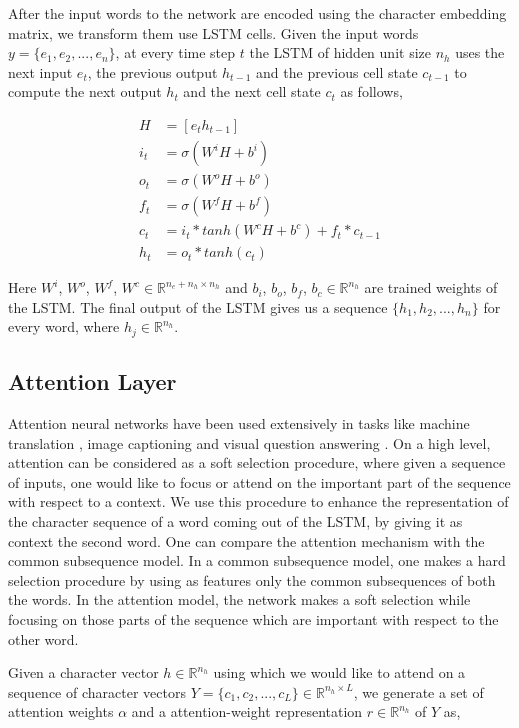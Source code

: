 \documentclass[11pt,letterpaper]{article}
\begin{document}
After the input words to the network are encoded using the character embedding matrix, we transform them use LSTM cells. Given the input words $y = \{e_1, e_2, ..., e_n\}$, at every time step $t$ the LSTM of hidden unit size $n_h$ uses the next input $e_t$, the previous output $h_{t-1}$ and the previous cell state $c_{t-1}$ to compute the next output $h_t$ and the next cell state $c_t$ as follows,

\begin{align}
H &= [e_t h_{t-1}] \\
i_t &= \sigma (W^iH + b^i) \\
o_t &= \sigma (W^oH + b^o) \\
f_t &= \sigma (W^fH + b^f) \\
c_t &= i_t * tanh(W^cH + b^c) + f_t * c_{t-1} \\
h_t &= o_t * tanh(c_t)
\end{align}

Here $W^i$, $W^o$, $W^f$, $W^c \in  \mathbb{R}^{n_e+n_h \times n_h}$ and $b_i$, $b_o$, $b_f$, $b_c \in \mathbb{R}^{n_h}$ are trained weights of the LSTM. The final output of the LSTM gives us a sequence $\{h_1, h_2, ..., h_n\}$ for every word, where $h_j \in \mathbb{R}^{n_h}$.

\subsection{Attention Layer}

Attention neural networks have been used extensively in tasks like machine translation \cite{mtattention}, image captioning \cite{cpattention} and visual question answering \cite{stackedattention}. On a high level, attention can be considered as a soft selection procedure, where given a sequence of inputs, one would like to focus or attend on the important part of the sequence with respect to a context. We use this procedure to enhance the representation of the character sequence of a word coming out of the LSTM, by giving it as context the second word. One can compare the attention mechanism with the common subsequence model. In a common subsequence model, one makes a hard selection procedure by using as features only the common subsequences of both the words. In the attention model, the network makes a soft selection while focusing on those parts of the sequence which are important with respect to the other word.

Given a character vector $h \in  \mathbb{R}^{n_h}$ using which we would like to attend on a sequence of character vectors $Y = \{c_1, c_2, ..., c_L\} \in \mathbb{R}^{n_h \times L}$, we generate a set of attention weights $\alpha$ and a attention-weight representation $r \in  \mathbb{R}^{n_h}$ of $Y$ as,
\end{document}
